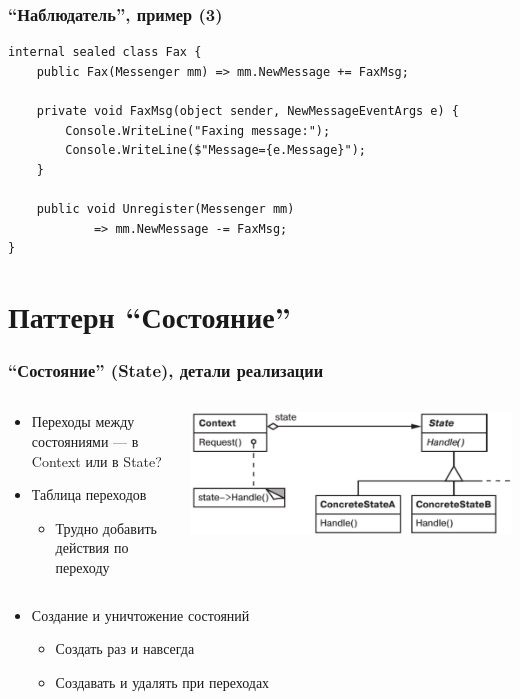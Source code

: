\documentclass[xetex,mathserif,serif]{beamer}
\begin{document}
	\begin{frame}[fragile]
		\frametitle{``Наблюдатель'', пример (3)}
		\begin{itemize}
			\begin{verbatim}
internal sealed class Fax {
    public Fax(Messenger mm) => mm.NewMessage += FaxMsg;

    private void FaxMsg(object sender, NewMessageEventArgs e) {
        Console.WriteLine("Faxing message:");
        Console.WriteLine($"Message={e.Message}");
    }

    public void Unregister(Messenger mm) 
            => mm.NewMessage -= FaxMsg;
}
			\end{verbatim}
		\end{itemize}
	\end{frame}

	\section{Паттерн ``Состояние''}

	\begin{frame}
		\frametitle{``Состояние'' (State), детали реализации}
		\begin{columns}
			\begin{column}{0.5\textwidth}
				\begin{itemize}
					\item Переходы между состояниями --- в Context или в State?
					\item Таблица переходов
					\begin{itemize}
						\item Трудно добавить действия по переходу
					\end{itemize}
				\end{itemize}
			\end{column}
			\begin{column}{0.5\textwidth}
				\begin{center}
					\includegraphics[width=\textwidth]{state.png}
				\end{center}
			\end{column}
		\end{columns}
		\begin{itemize}
			\item Создание и уничтожение состояний
			\begin{itemize}
				\item Создать раз и навсегда
				\item Создавать и удалять при переходах
			\end{itemize}
		\end{itemize}
	\end{frame}
\end{document}
